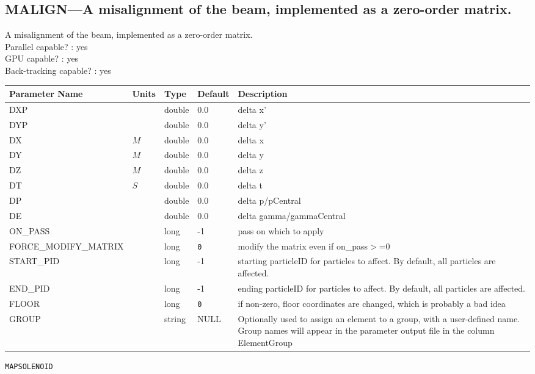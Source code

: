 \subsection{MALIGN---A misalignment of the beam, implemented as a zero-order matrix.}
A misalignment of the beam, implemented as a zero-order matrix.
\\
Parallel capable? : yes\\
GPU capable? : yes\\
Back-tracking capable? : yes\\
\begin{tabular}{|l|l|l|l|p{\descwidth}|} \hline
Parameter Name & Units & Type & Default & Description \\ \hline 
DXP &  & double &  0.0 & delta x'  \\ \hline 
DYP &  & double &  0.0 & delta y'  \\ \hline 
DX & $M$ & double &  0.0 & delta x  \\ \hline 
DY & $M$ & double &  0.0 & delta y  \\ \hline 
DZ & $M$ & double &  0.0 & delta z  \\ \hline 
DT & $S$ & double &  0.0 & delta t  \\ \hline 
DP &  & double &  0.0 & delta p/pCentral  \\ \hline 
DE &  & double &  0.0 & delta gamma/gammaCentral  \\ \hline 
ON\_PASS &  & long &   -1              & pass on which to apply  \\ \hline 
FORCE\_MODIFY\_MATRIX &  & long &  \verb|0| & modify the matrix even if on\_pass$>$=0  \\ \hline 
START\_PID &  & long &   -1              & starting particleID for particles to affect. By default, all particles are affected.  \\ \hline 
END\_PID &  & long &   -1              & ending particleID for particles to affect. By default, all particles are affected.  \\ \hline 
FLOOR &  & long &  \verb|0| & if non-zero, floor coordinates are changed, which is probably a bad idea  \\ \hline 
GROUP &  & string & NULL & Optionally used to assign an element to a group, with a user-defined name.  Group names will appear in the parameter output file in the column ElementGroup  \\ \hline 
\end{tabular}

\vspace*{0.5in}

\newpage
\begin{center}{\Large\verb|MAPSOLENOID|}\end{center}
